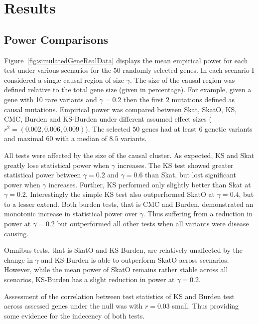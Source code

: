 \section{Results}
\label{sec:results}

\subsection{Power Comparisons}
\label{sub:power_comparisons}

Figure~\ref{fig:simulatedGeneRealData} displays the mean empirical power for each test under various scenarios for the 50 randomly selected genes.
In each scenario I considered a single causal region of size $\gamma$.
The size of the causal region was defined relative to the total gene size (given in percentage).
For example, given a gene with 10 rare variants and $\gamma=0.2$ then the first $2$ mutations defined as causal mutations.
Empirical power was compared between Skat, SkatO, KS, CMC, Burden and KS-Burden under different assumed effect sizes ($r^2=(0.002, 0.006, 0.009)$).
The selected $50$ genes had at least $6$ genetic variants and maximal $60$ with a median of $8.5$ variants.

All tests were affected by the size of the causal cluster.
As expected, KS and Skat greatly lose statistical power when $\gamma$ increases.
The KS test showed greater statistical power between $\gamma=0.2$ and $\gamma=0.6$ than Skat, but lost significant power when $\gamma$ increases.
Further, KS performed only slightly better than Skat at $\gamma=0.2$.
Interestingly the simple KS test also outperformed SkatO at $\gamma=0.4$, but to a lesser extend.
Both burden tests, that is CMC and Burden, demonstrated an monotonic increase in statistical power over $\gamma$.
Thus suffering from a reduction in power at $\gamma=0.2$ but outperformed all other tests when all variants were disease causing.

Omnibus tests, that is SkatO and KS-Burden, are relatively unaffected by the change in $\gamma$ and KS-Burden is able to outperform SkatO across scenarios.
However, while the mean power of SkatO remains rather stable across all scenarios, KS-Burden has a slight reduction in power at $\gamma=0.2$.

Assessment of the correlation between test statistics of KS and Burden test across assessed genes under the null was with $r=0.03$ small.
Thus providing some evidence for the indecency of both tests. %

